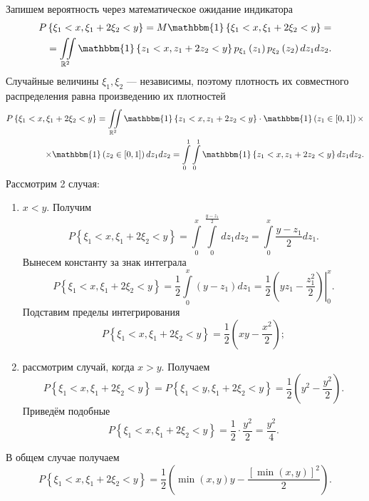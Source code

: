 Запишем вероятность через математическое ожидание индикатора
\begin{equation*}
\begin{split}
P \left\{ \xi_1 < x, \xi_1 + 2 \xi_2 < y \right\} =
M \mathbbm{1} \left\{ \xi_1 < x, \xi_1 + 2 \xi_2 < y \right\} = \\
= \iint \limits_{ \mathbb{R}^2} \mathbbm{1} \left\{ z_1 < x, z_1 + 2 z_2 < y \right\} p_{ \xi_1} \left( z_1 \right) p_{ \xi_2} \left( z_2 \right) dz_1 dz_2.
\end{split}
\end{equation*}
Случайные величины $ \xi_1, \xi_2$ --- независимы, поэтому плотность их совместного распределения равна произведению их плотностей
\begin{equation*}
\begin{split}
P \left\{ \xi_1 < x, \xi_1 + 2 \xi_2 < y \right\} =
\iint \limits_{ \mathbb{R}^2} \mathbbm{1} \left\{ z_1 < x, z_1 + 2 z_2 < y \right\} \cdot
\mathbbm{1} \left( z_1 \in \left[ 0, 1 \right] \right) \times \\
\times \mathbbm{1} \left( z_2 \in \left[ 0, 1 \right] \right) dz_1 dz_2 =
\int \limits_0^1 \int \limits_0^1 \mathbbm{1} \left\{ z_1 < x, z_1 + 2 z_2 < y \right\} dz_1 dz_2.
\end{split}
\end{equation*}
Рассмотрим 2 случая:
\begin{enumerate}
\item $x < y$.
Получим
$$P \left\{ \xi_1 < x, \xi_1 + 2 \xi_2 < y \right\} =
\int \limits_0^x \int \limits_0^{ \frac{y-z_1}{2}} dz_1 dz_2 =
\int \limits_0^x \frac{y-z_1}{2} dz_1.$$
Вынесем константу за знак интеграла
$$P \left\{ \xi_1 < x, \xi_1 + 2 \xi_2 < y \right\} =
\frac{1}{2} \int \limits_0^x \left( y-z_1 \right) dz_1 =
\left. \frac{1}{2} \left( yz_1 - \frac{z_1^2}{2} \right) \right|_0^x.$$
Подставим пределы интегрирования
$$P \left\{ \xi_1 < x, \xi_1 + 2 \xi_2 < y \right\} =
\frac{1}{2} \left( xy - \frac{x^2}{2} \right);$$
\item рассмотрим случай, когда $x > y$.
Получаем
$$P \left\{ \xi_1 < x, \xi_1 + 2 \xi_2 < y \right\} =
P \left\{ \xi_1 < y, \xi_1 + 2 \xi_2 < y \right\} =
\frac{1}{2} \left( y^2 - \frac{y^2}{2} \right).$$
Приведём подобные
$$P \left\{ \xi_1 < x, \xi_1 + 2 \xi_2 < y \right\} =
\frac{1}{2} \cdot \frac{y^2}{2} =
\frac{y^2}{4}.$$
\end{enumerate}

В общем случае получаем
$$P \left\{ \xi_1 < x, \xi_1 + 2 \xi_2 < y \right\} =
\frac{1}{2} \left( \min \left( x, y \right) y - \frac{\left[ \min \left( x, y \right) \right]^2}{2} \right).$$
